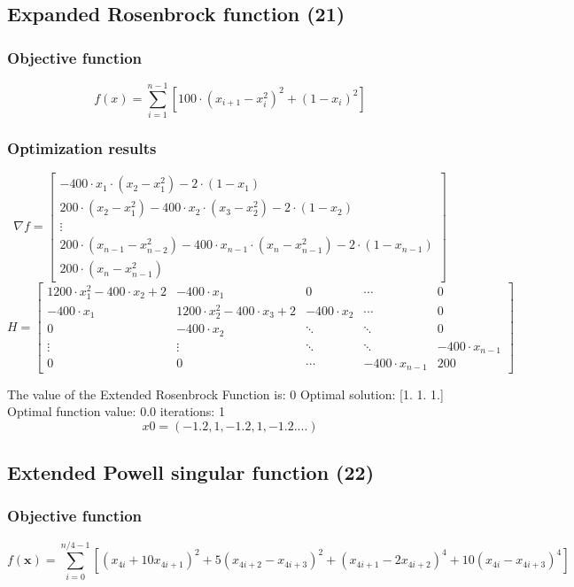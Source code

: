\documentclass{article}
\begin{document}
\subsection{ Expanded Rosenbrock function (21)}
\subsubsection{Objective function}
$$f(x) = \sum_{i=1}^{n-1} \left[ 100 \cdot (x_{i+1} - x_i^2)^2 + (1 - x_i)^2 \right]
$$
\subsubsection{Optimization results}
$$ \nabla f = \begin{bmatrix}
-400 \cdot x_1 \cdot (x_2 - x_1^2) - 2 \cdot (1 - x_1) \\
200 \cdot (x_2 - x_1^2) - 400 \cdot x_2 \cdot (x_3 - x_2^2) - 2 \cdot (1 - x_2) \\
\vdots \\
200 \cdot (x_{n-1} - x_{n-2}^2) - 400 \cdot x_{n-1} \cdot (x_n - x_{n-1}^2) - 2 \cdot (1 - x_{n-1}) \\
200 \cdot (x_n - x_{n-1}^2)
\end{bmatrix}
 $$
$$H = \begin{bmatrix}
1200 \cdot x_1^2 - 400 \cdot x_2 + 2 & -400 \cdot x_1 & 0 & \cdots & 0 \\
-400 \cdot x_1 & 1200 \cdot x_2^2 - 400 \cdot x_3 + 2 & -400 \cdot x_2 & \cdots & 0 \\
0 & -400 \cdot x_2 & \ddots & \ddots & 0 \\
\vdots & \vdots & \ddots & \ddots & -400 \cdot x_{n-1} \\
0 & 0 & \cdots & -400 \cdot x_{n-1} & 200
\end{bmatrix}
$$

The value of the Extended Rosenbrock Function is: 0
Optimal solution: [1. 1. 1.]
Optimal function value: 0.0
iterations: 1
$$ x0=(-1.2,1,-1.2,1,-1.2....)$$
\subsection{Extended Powell singular function (22)}

\subsubsection{Objective function}
$$f(\mathbf{x}) = \sum_{i=0}^{n/4-1} \left[ (x_{4i} + 10x_{4i+1})^2 + 5(x_{4i+2} - x_{4i+3})^2 + (x_{4i+1} - 2x_{4i+2})^4 + 10(x_{4i} - x_{4i+3})^4 \right]$$
\end{document}

